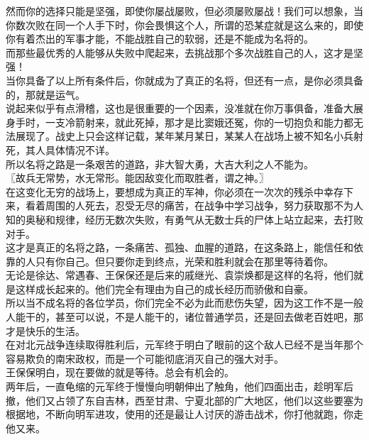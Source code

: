 \begin{multicols}{\theparacolNo}
然而你的选择只能是坚强，即使你屡战屡败，但必须屡败屡战！我们可以想象，当你数次败在同一个人手下时，你会畏惧这个人，所谓的恐某症就是这么来的，即使你有着杰出的军事才能，不能战胜自己的软弱，还是不能成为名将的。\\

而那些最优秀的人能够从失败中爬起来，去挑战那个多次战胜自己的人，这才是坚强！\\

当你具备了以上所有条件后，你就成为了真正的名将，但还有一点，是你必须具备的，那就是运气。\\

说起来似乎有点滑稽，这也是很重要的一个因素，没准就在你万事俱备，准备大展身手时，一支冷箭射来，就此死掉，那才是比窦娥还冤，你的一切抱负和能力都无法展现了。战史上只会这样记载，某年某月某日，某某人在战场上被不知名小兵射死，其人具体情况不详。\\

所以名将之路是一条艰苦的道路，非大智大勇，大吉大利之人不能为。\\

〖故兵无常势，水无常形。能因敌变化而取胜者，谓之神。〗\\

在这变化无穷的战场上，要想成为真正的军神，你必须在一次次的残杀中幸存下来，看着周围的人死去，忍受无尽的痛苦，在战争中学习战争，努力获取那不为人知的奥秘和规律，经历无数次失败，有勇气从无数士兵的尸体上站立起来，去打败对手。\\

这才是真正的名将之路，一条痛苦、孤独、血腥的道路，在这条路上，能信任和依靠的人只有你自己。但只要你走到终点，光荣和胜利就会在那里等待着你。\\

无论是徐达、常遇春、王保保还是后来的戚继光、袁崇焕都是这样的名将，他们就是这样成长起来的。他们完全有理由为自己的成长经历而骄傲和自豪。\\

所以当不成名将的各位学员，你们完全不必为此而悲伤失望，因为这工作不是一般人能干的，甚至可以说，不是人能干的，诸位普通学员，还是回去做老百姓吧，那才是快乐的生活。\\

在对北元战争连续取得胜利后，元军终于明白了眼前的这个敌人已经不是当年那个容易欺负的南宋政权，而是一个可能彻底消灭自己的强大对手。\\

王保保明白，现在要做的就是等待。总会有机会的。\\

两年后，一直龟缩的元军终于慢慢向明朝伸出了触角，他们四面出击，趁明军后撤，他们又占领了东自吉林，西至甘肃、宁夏北部的广大地区，他们以这些要塞为根据地，不断向明军进攻，使用的还是最让人讨厌的游击战术，你打他就跑，你走他又来。\\


\end{multicols}
